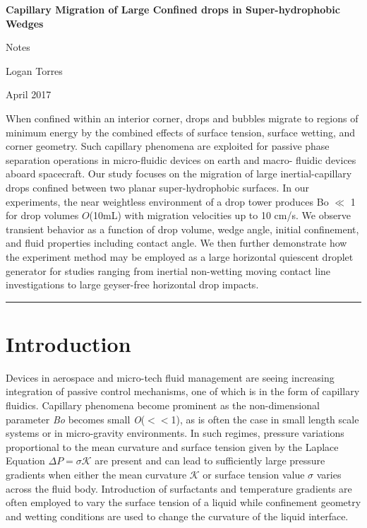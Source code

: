 \documentclass{article}
\begin{document}
\begin{center}
\huge\textbf{Capillary Migration of Large Confined drops in Super-hydrophobic Wedges}
\end{center} 

\begin{center}
\large Notes

\Large Logan Torres

\large April 2017
\end{center}

\noindent When confined within an interior corner, drops and bubbles
migrate to regions of minimum energy by the combined effects of surface tension,
surface wetting, and corner geometry. Such capillary phenomena are exploited for
passive phase separation operations in micro-fluidic devices on earth and macro-
fluidic devices aboard spacecraft. Our study focuses on the migration of large
inertial-capillary drops confined between two planar super-hydrophobic surfaces. In
our experiments, the near weightless environment of a drop tower produces Bo $\ll$ 1
for drop volumes $O$(10mL) with migration velocities up to 10 cm/s. We observe
transient behavior as a function of drop volume, wedge angle, initial
confinement, and fluid properties including contact angle. We then further demonstrate
how the experiment method may be employed as a large horizontal quiescent
droplet generator for studies ranging from inertial non-wetting moving contact line
investigations to large geyser-free horizontal drop impacts.

\hspace*{200pt}

\hrule
\section*{Introduction}
Devices in aerospace  and micro-tech fluid management are seeing increasing integration of passive control mechanisms, one of which is in the form of capillary fluidics.  Capillary phenomena become prominent as the non-dimensional parameter \textit{Bo} becomes small \textit{O}($<<$1), as is often the case in small length scale systems or in micro-gravity environments. In such regimes, pressure variations proportional to the mean curvature and surface tension given by the Laplace Equation $\Delta P = \sigma \mathcal{K} $ are present and can lead to sufficiently large pressure gradients when either the mean curvature $\mathcal{K}$ or surface tension value $\sigma$ varies across the fluid body. Introduction of surfactants and temperature gradients are often employed to vary the surface tension of a liquid while confinement geometry and wetting conditions are used to change the curvature of the liquid interface. 
\end{document}
